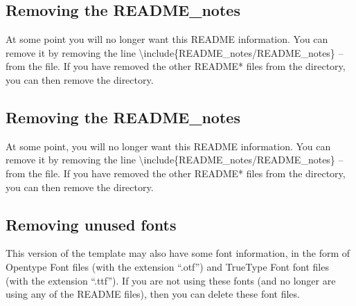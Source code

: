\subsection{Removing the README\_notes}
At some point you will no longer want this README information. You can remove it by removing the line
\textbackslash include\{README\_notes/README\_notes\} -- from the  file. If you have removed the other README* files from the  directory, you can then remove the  directory.

\subsection{Removing the README\_notes}
At some point, you will no longer want this README information. You can remove it by removing the line
\textbackslash include\{README\_notes/README\_notes\} -- from the  file. If you have removed the other README* files from the  directory, you can then remove the  directory.

\subsection{Removing unused fonts}
This version of the template may also have some font information, in the form of Opentype Font files (with the extension ``.otf'') and TrueType Font font files (with the extension ``.ttf''). If you are not using these fonts (and no longer are using any of the README files), then you can delete these font files.

\printglossary[type=readme,toctitle={README acronyms}]


